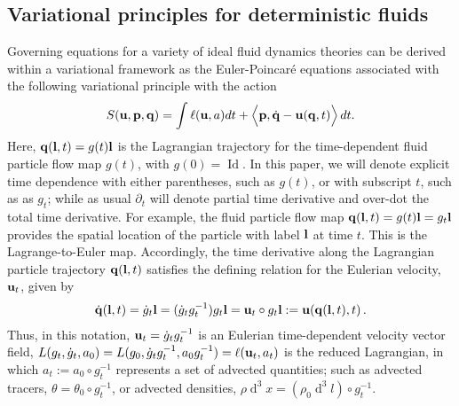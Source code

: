 \documentclass[12pt,onesided]{article}
\def\q{{\bf{q}}}
\def\p{{\bf{p}}}
\def\l{{\bf{l}}}
\def\u{{\bf{u}}}
\DeclareMathOperator{\diff}{d}
\newcommand{\difft}{d}
\newcommand*{\Id}{\operatorname{Id}}
\begin{document}
\subsection{Variational principles for deterministic fluids}
Governing equations for a variety of ideal fluid dynamics theories can be derived within a variational framework as the Euler-Poincar\'e equations associated with the following variational principle with the action \cite{holm1998euler}
\begin{align}
S(\u,\p,\q) = \int \ell(\u,a) \difft t 
+ \Big\langle \p,\dot{\q}-\u(\q,t) \Big\rangle\,\difft t.
\label{Clebsch-var-princ}
\end{align}
Here, $\q(\l,t)=g(t)\l$ is the Lagrangian trajectory for the time-dependent fluid particle flow map $g(t)$, with $g(0)=\Id$. In this paper, we will denote explicit time dependence with either parentheses, such as $g(t)$, or with subscript $t$, such as as $g_t$; while as usual $\partial_t$ will denote partial time derivative and over-dot the total time derivative. For example, the fluid particle flow map $\q(\l,t)=g(t)\l=g_t\l$ provides the spatial location of the particle with label $\l$ at time $t$.  This is the Lagrange-to-Euler map. Accordingly, the time derivative along the Lagrangian particle trajectory $\q(\l,t)$ satisfies the defining relation for the Eulerian velocity, $\u_t$, given by
\begin{align}
  \label{eq:qdot}
\dot \q(\l,t) = \dot{g}_t\l = (\dot{g}_tg_t^{-1})g_t\l = \u_t\circ g_t\l := \u(\q(\l,t),t)\,.
\end{align}
Thus, in this notation, $\u_t=\dot{g}_tg_t^{-1}$ is an Eulerian time-dependent velocity vector field, $L(g_t,\dot{g}_t,a_0)=L(g_0,\dot{g}_tg_t^{-1},a_0g_t^{-1})=\ell(\u_t,a_t)$ is the reduced Lagrangian, in which $a_t:=a_0\circ g_t^{-1}$ represents a set of advected quantities; such as advected tracers, $\theta = \theta_0\circ g_t^{-1}$, or advected densities, $\rho \diff^3x = (\rho_0\diff^3l)\circ g_t^{-1}$.
\end{document}
